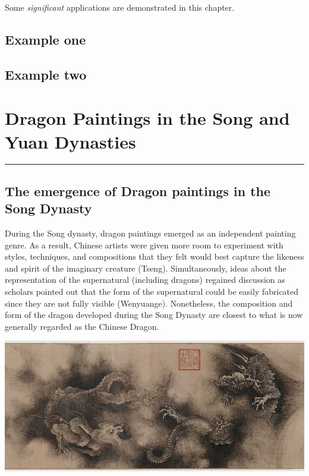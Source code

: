 \documentclass[
]{book}
\begin{document}
Some \emph{significant} applications are demonstrated in this chapter.

\hypertarget{example-one}{%
\section{Example one}\label{example-one}}

\hypertarget{example-two}{%
\section{Example two}\label{example-two}}

\hypertarget{Dragon_Paintings}{%
\chapter*{Dragon Paintings in the Song and Yuan Dynasties}\label{Dragon_Paintings}}

\begin{center}\rule{0.5\linewidth}{0.5pt}\end{center}

\hypertarget{the-emergence-of-dragon-paintings-in-the-song-dynasty}{%
\section*{The emergence of Dragon paintings in the Song Dynasty}\label{the-emergence-of-dragon-paintings-in-the-song-dynasty}}

During the Song dynasty, dragon paintings emerged as an independent painting genre. As a result, Chinese artists were given more room to experiment with styles, techniques, and compositions that they felt would best capture the likeness and spirit of the imaginary creature (Tseng). Simultaneously, ideas about the representation of the supernatural (including dragons) regained discussion as scholars pointed out that the form of the supernatural could be easily fabricated since they are not fully visible (Wenyuange). Nonetheless, the composition and form of the dragon developed during the Song Dynasty are closest to what is now generally regarded as the Chinese Dragon.

\includegraphics[width=1.2\textwidth,height=\textheight]{images/Nine_Dragons.jpg}
\end{document}
